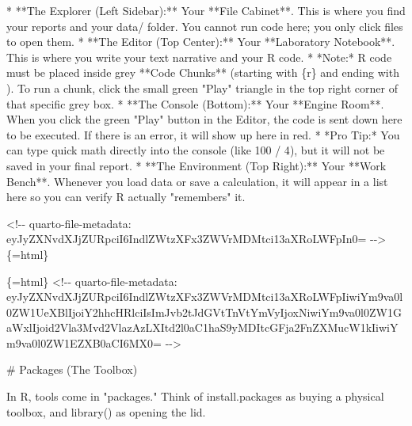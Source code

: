 \documentclass[
  letterpaper,
  DIV=11,
  numbers=noendperiod,
  oneside]{scrreprt}
\newenvironment{Shaded}{\begin{snugshade}}{\end{snugshade}}
\newcommand{\FunctionTok}[1]{\textcolor[rgb]{0.28,0.35,0.67}{#1}}
\newcommand{\InformationTok}[1]{\textcolor[rgb]{0.37,0.37,0.37}{#1}}
\newcommand{\NormalTok}[1]{\textcolor[rgb]{0.00,0.23,0.31}{#1}}
\newcommand{\SpecialStringTok}[1]{\textcolor[rgb]{0.13,0.47,0.30}{#1}}
\begin{document}
\begin{Shaded}
\begin{Highlighting}[numbers=left,,]
\SpecialStringTok{* }\NormalTok{**The Explorer (Left Sidebar):** Your **File Cabinet**. This is where you find your reports and your }\InformationTok{\textasciigrave{}data/\textasciigrave{}}\NormalTok{ folder. You cannot run code here; you only click files to open them.}
\SpecialStringTok{* }\NormalTok{**The Editor (Top Center):** Your **Laboratory Notebook**. This is where you write your text narrative and your R code. }
\SpecialStringTok{    * }\NormalTok{*Note:* R code must be placed inside grey **Code Chunks** (starting with \textasciigrave{} \textasciigrave{}\textasciigrave{}}\InformationTok{\textasciigrave{}\{r\} \textasciigrave{}}\NormalTok{ and ending with \textasciigrave{} \textasciigrave{}\textasciigrave{}}\InformationTok{\textasciigrave{} \textasciigrave{}}\NormalTok{). To run a chunk, click the small green "Play" triangle in the top right corner of that specific grey box.}
\SpecialStringTok{* }\NormalTok{**The Console (Bottom):** Your **Engine Room**. When you click the green "Play" button in the Editor, the code is sent down here to be executed. If there is an error, it will show up here in red. }
\SpecialStringTok{    * }\NormalTok{*Pro Tip:* You can type quick math directly into the console (like }\InformationTok{\textasciigrave{}100 / 4\textasciigrave{}}\NormalTok{), but it will not be saved in your final report.}
\SpecialStringTok{* }\NormalTok{**The Environment (Top Right):** Your **Work Bench**. Whenever you load data or save a calculation, it will appear in a list here so you can verify R actually "remembers" it.}


\InformationTok{\textasciigrave{}\textless{}!{-}{-} quarto{-}file{-}metadata: eyJyZXNvdXJjZURpciI6IndlZWtzXFx3ZWVrMDMtci13aXRoLWFpIn0= {-}{-}\textgreater{}\textasciigrave{}}\NormalTok{\{=html\}}

\InformationTok{\textasciigrave{}\textasciigrave{}\textasciigrave{}\{=html\}}
\InformationTok{\textless{}!{-}{-} quarto{-}file{-}metadata: eyJyZXNvdXJjZURpciI6IndlZWtzXFx3ZWVrMDMtci13aXRoLWFpIiwiYm9va0l0ZW1UeXBlIjoiY2hhcHRlciIsImJvb2tJdGVtTnVtYmVyIjoxNiwiYm9va0l0ZW1GaWxlIjoid2Vla3Mvd2VlazAzLXItd2l0aC1haS9yMDItcGFja2FnZXMucW1kIiwiYm9va0l0ZW1EZXB0aCI6MX0= {-}{-}\textgreater{}}
\InformationTok{\textasciigrave{}\textasciigrave{}\textasciigrave{}}

\FunctionTok{\# Packages (The Toolbox) }


\NormalTok{In R, tools come in "packages." Think of }\InformationTok{\textasciigrave{}install.packages\textasciigrave{}}\NormalTok{ as buying a physical toolbox, and }\InformationTok{\textasciigrave{}library()\textasciigrave{}}\NormalTok{ as opening the lid.}


\end{Highlighting}
\end{Shaded}
\end{document}
